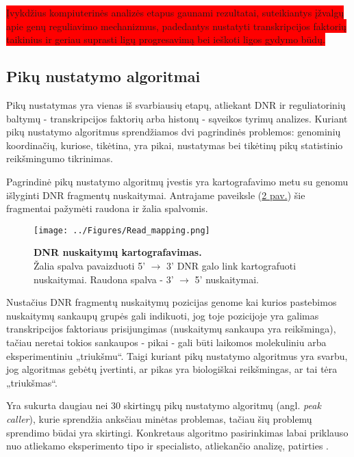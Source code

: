 \documentclass[12pt]{article}
\begin{document}
\colorbox{red}{Įvykdžius kompiuterinės analizės etapus gaunami rezultatai, suteikiantys
įžvalgų apie genų reguliavimo mechanizmus, padedantys nustatyti
transkripcijos faktorių taikinius ir geriau suprasti ligų progresavimą bei
ieškoti ligos gydymo būdų.}

\newpage

\subsection{Pikų nustatymo algoritmai}
Pikų nustatymas yra vienas iš svarbiausių etapų, atliekant DNR ir reguliatorinių
baltymų - transkripcijos faktorių arba histonų - sąveikos tyrimų analizes.
Kuriant pikų nustatymo algoritmus sprendžiamos dvi pagrindinės problemos:
genominių koordinačių, kuriose, tikėtina, yra pikai, nustatymas bei tikėtinų
pikų statistinio reikšmingumo tikrinimas.

Pagrindinė pikų nustatymo algoritmų įvestis yra kartografavimo metu su genomu
išlyginti DNR fragmentų nuskaitymai. Antrajame paveiksle
(\hyperref[fig:image2]{2 pav.}) šie fragmentai pažymėti raudona ir žalia
spalvomis.

\begin{figure}[ht]
    \begin{center}
        \captionsetup{justification=centering}
        \texttt{[image: ../Figures/Read\_mapping.png]}
        \vspace{-1\baselineskip}
        \caption{\small\textbf{DNR nuskaitymų kartografavimas.}\\Žalia
            spalva pavaizduoti 5' \(\rightarrow\) 3' DNR galo link kartografuoti
            nuskaitymai. Raudona spalva - 3' \(\rightarrow\) 5' nuskaitymai.}
        \label{fig:image2}
    \end{center}
\end{figure}

Nustačius DNR fragmentų nuskaitymų pozicijas genome kai kurios pastebimos
nuskaitymų sankaupų grupės gali indikuoti, jog toje pozicijoje yra galimas
transkripcijos faktoriaus prisijungimas (nuskaitymų sankaupa yra reikšminga),
tačiau neretai tokios sankaupos - pikai - gali būti laikomos molekuliniu arba
eksperimentiniu „triukšmu“. Taigi kuriant pikų nustatymo algoritmus yra
svarbu, jog algoritmas gebėtų įvertinti, ar pikas yra biologiškai reikšmingas,
ar tai tėra „triukšmas“.

Yra sukurta daugiau nei 30 skirtingų pikų nustatymo algoritmų (angl.
\emph{peak caller}), kurie sprendžia anksčiau minėtas problemas,
tačiau šių problemų sprendimo būdai yra skirtingi. Konkretaus algoritmo
pasirinkimas labai priklauso nuo atliekamo eksperimento tipo ir specialisto,
atliekančio analizę, patirties \cite{ARTICLE13}.
\end{document}

